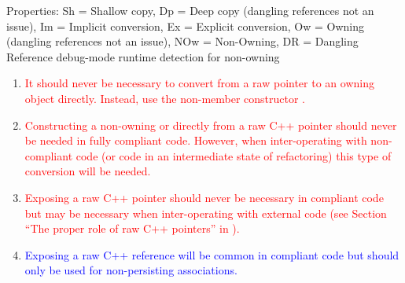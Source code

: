 {\begin{minipage}{\textwidth}
Properties: Sh = Shallow copy, Dp = Deep copy (dangling references not
an issue), Im = Implicit conversion, Ex = Explicit conversion, Ow =
Owning (dangling references not an issue), NOw = Non-Owning, DR =
Dangling Reference debug-mode runtime detection for non-owning

\begin{enumerate}
%
{}\item\label{conv:arcp-owning}\textcolor{red}{It should never be
necessary to convert from a raw pointer to an owning {}
object directly.  Instead, use the non-member constructor
{}.}
%
{}\item\label{conv:arcp-nonowning}\textcolor{red}{Constructing a
non-owning {} or {} directly from a raw
C++ pointer should never be needed in fully compliant code.  However,
when inter-operating with non-compliant code (or code in an intermediate
state of refactoring) this type of conversion will be needed.}
%
{}\item\label{conv:array-expose-raw-ptr}\textcolor{red}{Exposing a raw
C++ pointer should never be necessary in compliant code but may be
necessary when inter-operating with external code (see Section ``The
proper role of raw C++ pointers'' in
{}\cite{TeuchosMemoryManagementGuide}).}
%
{}\item\label{conv:array-expose-raw-ref}\textcolor{blue}{Exposing a
raw C++ reference will be common in compliant code but should only be
used for non-persisting associations.}
%
\end{enumerate}

\end{minipage}}
